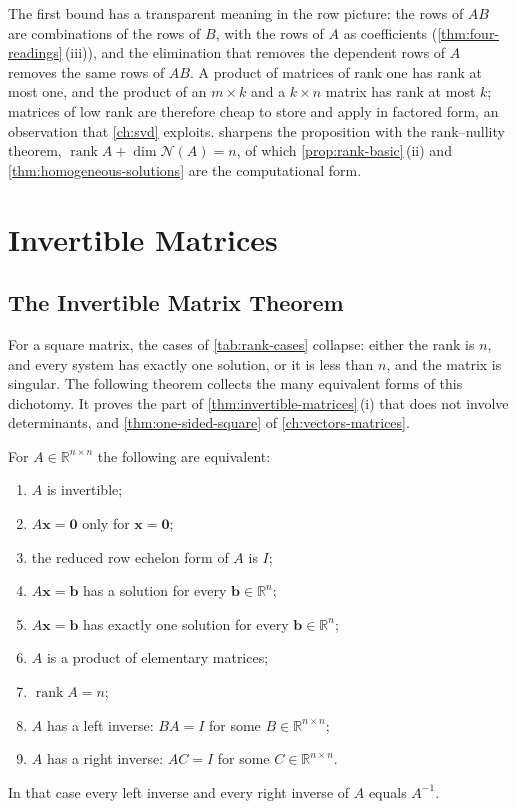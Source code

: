 The first bound has a transparent meaning in the row picture: the rows of $AB$ are combinations of the rows of $B$, with the rows of $A$ as coefficients (\cref{thm:four-readings}\,(iii)), and the elimination that removes the dependent rows of $A$ removes the same rows of $AB$. A product of matrices of rank one has rank at most one, and the product of an $m\times k$ and a $k\times n$ matrix has rank at most $k$; matrices of low rank are therefore cheap to store and apply in factored form, an observation that \cref{ch:svd} exploits.  sharpens the proposition with the rank--nullity theorem, $\operatorname{rank}A+\dim\mathcal N(A)=n$, of which \cref{prop:rank-basic}\,(ii) and \cref{thm:homogeneous-solutions} are the computational form.

\section{Invertible Matrices}
\label{sec:invertible}

\subsection{The Invertible Matrix Theorem}

For a square matrix, the cases of \cref{tab:rank-cases} collapse: either the rank is $n$, and every system has exactly one solution, or it is less than $n$, and the matrix is singular. The following theorem collects the many equivalent forms of this dichotomy. It proves the part of \cref{thm:invertible-matrices}\,(i) that does not involve determinants, and \cref{thm:one-sided-square} of \cref{ch:vectors-matrices}.

\begin{theorem}
\label{thm:invertible}
For $A\in\mathbb R^{n\times n}$ the following are equivalent:
\begin{enumerate}
\item $A$ is invertible;
\item $A\mathbf x=\mathbf 0$ only for $\mathbf x=\mathbf 0$;
\item the reduced row echelon form of $A$ is $I$;
\item $A\mathbf x=\mathbf b$ has a solution for every $\mathbf b\in\mathbb R^n$;
\item $A\mathbf x=\mathbf b$ has exactly one solution for every $\mathbf b\in\mathbb R^n$;
\item $A$ is a product of elementary matrices;
\item $\operatorname{rank}A=n$;
\item $A$ has a left inverse: $BA=I$ for some $B\in\mathbb R^{n\times n}$;
\item $A$ has a right inverse: $AC=I$ for some $C\in\mathbb R^{n\times n}$.
\end{enumerate}
In that case every left inverse and every right inverse of $A$ equals $A^{-1}$.
\end{theorem}

